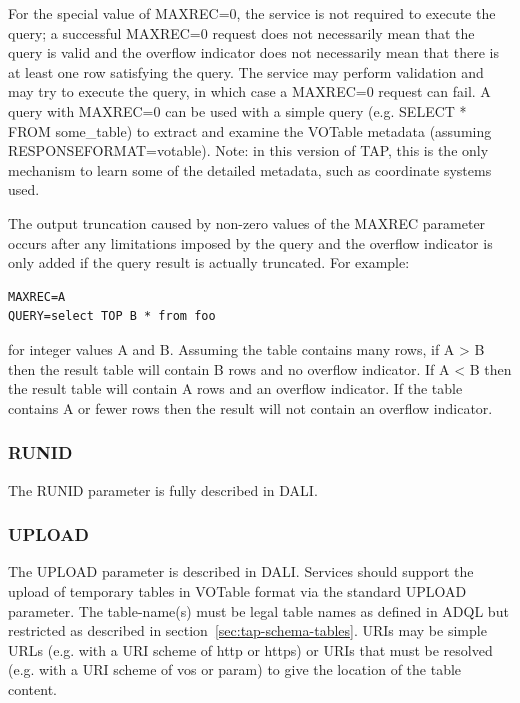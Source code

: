 \documentclass[11pt,letter]{ivoa}
\begin{document}
For the special value of MAXREC=0, the service is not required to execute the 
query; a successful  MAXREC=0 request does not necessarily mean that the query 
is valid and the overflow indicator does not necessarily mean that there is at 
least one row satisfying the query. The service may perform validation and may 
try to execute the query, in which case a MAXREC=0 request can fail. A query 
with MAXREC=0 can be used with a simple query (e.g. SELECT * FROM  
some\_table) to extract and examine the VOTable metadata (assuming 
RESPONSEFORMAT=votable). Note: in this version of TAP, this is the only mechanism to 
learn some of the detailed metadata, such as coordinate systems used.

The output truncation caused by non-zero values of the MAXREC parameter occurs after any 
limitations imposed by the query and the overflow indicator is only added if 
the query result is actually truncated. For example:

\begin{verbatim}
MAXREC=A
QUERY=select TOP B * from foo
\end{verbatim}

for integer values A and B. Assuming the table contains many rows, if A > B 
then the result table will contain B rows and no overflow indicator. If A < B 
then the result table will contain A rows and an overflow indicator. If the 
table contains A or fewer rows then the result will not contain an overflow 
indicator.

\subsubsection{RUNID}
The RUNID parameter is fully described in DALI.

\subsubsection{UPLOAD}
\label{sec:UPLOAD}

The UPLOAD parameter is described in DALI. Services should support 
the 
upload of temporary tables in VOTable \citep{2013ivoa.spec.0920O} format via the standard 
UPLOAD 
parameter. The table-name(s) must be legal table names as defined in 
ADQL \citep{2008ivoa.spec.1030O} but restricted as described in section~\ref{sec:tap-schema-tables}. 
URIs may be simple URLs (e.g. with a URI scheme of http or https) or 
URIs that must be resolved (e.g. with a URI scheme of vos or param) to give 
the location of the table content.
\end{document}
